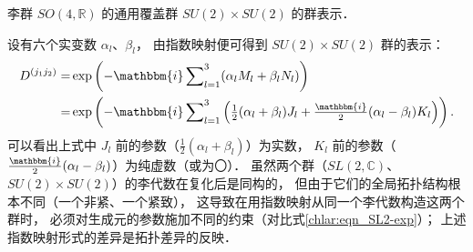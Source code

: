 \begin{example}
	李群 $SO(4,\mathbb{R})$ 的通用覆盖群 $SU(2)\times SU(2)$ 的群表示．
\end{example}
设有六个实变数 $\alpha_l$、$\beta_l$，
由指数映射便可得到 $SU(2)\times SU(2)$ 群的表示：
\begin{align*}
	D^{(j_1 j_2)}=&\exp\left(-\mathbbm{i}\sum\nolimits_{l=1}^{3}(\alpha_l M_l + \beta_l N_l)\right)\\
	=&\exp\left(-\mathbbm{i}\sum\nolimits_{l=1}^{3}\left(
	\tfrac{1}{2}(\alpha_l+\beta_l)J_l +  \tfrac{\mathbbm{i}}{2} (\alpha_l-\beta_l)K_l \right) \right).
\end{align*}
可以看出上式中 $J_l$ 前的参数（$\tfrac{1}{2}(\alpha_l+\beta_l)$）为实数，
$K_l$ 前的参数（$\tfrac{\mathbbm{i}}{2} (\alpha_l-\beta_l)$）为纯虚数（或为〇）．
虽然两个群（$SL(2,\mathbb{C})$、$SU(2)\times SU(2)$）的李代数在复化后是同构的，
但由于它们的全局拓扑结构根本不同（一个非紧、一个紧致），
这导致在用指数映射从同一个李代数构造这两个群时，
必须对生成元的参数施加不同的约束（对比式\eqref{chlar:eqn_SL2-exp}）；
上述指数映射形式的差异是拓扑差异的反映．


